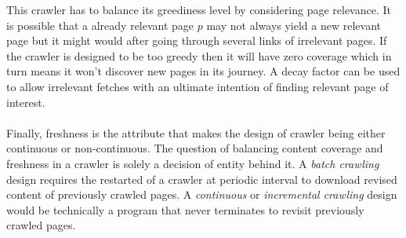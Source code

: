 \noindent
This crawler has to balance its greediness level by considering page relevance. It is possible that a
already relevant page $p$ may not always yield a new relevant page but it might would after going through
several links of irrelevant pages. If the crawler is designed to be too greedy then it will have zero
coverage which in turn means it won't discover new pages in its journey. A decay factor can be used to
allow irrelevant fetches with an ultimate intention of finding relevant page of interest.
\\
\\
Finally, freshness is the attribute that makes the design of crawler being either continuous or non-continuous. The question of balancing content coverage and freshness in a crawler is solely a decision of entity behind it. A \textit{batch crawling} design requires the restarted of a crawler at periodic interval to download revised content of previously crawled pages. A \textit{continuous} or \textit{incremental crawling} design
would be technically a program that never terminates to revisit previously crawled pages.


